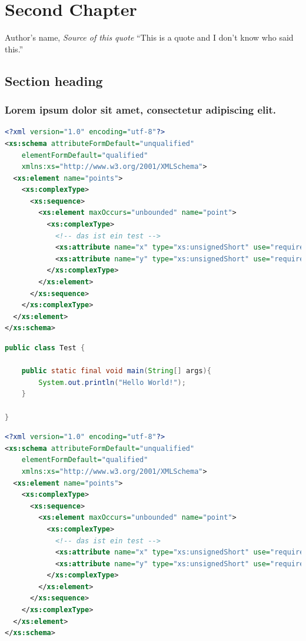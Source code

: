 
\chapter{Second Chapter}

\begin{chapquote}{Author's name, \textit{Source of this quote}}
``This is a quote and I don't know who said this.''
\end{chapquote}

\section{Section heading}
\lipsum[1-2]

\subsection{Lorem ipsum dolor sit amet, consectetur adipiscing elit.}
\lipsum[1-2]

\begin{lstlisting}[language=XML]
<?xml version="1.0" encoding="utf-8"?>
<xs:schema attributeFormDefault="unqualified" 
    elementFormDefault="qualified" 
    xmlns:xs="http://www.w3.org/2001/XMLSchema">
  <xs:element name="points">
    <xs:complexType>
      <xs:sequence>
        <xs:element maxOccurs="unbounded" name="point">
          <xs:complexType>
            <!-- das ist ein test -->  
            <xs:attribute name="x" type="xs:unsignedShort" use="required" />
            <xs:attribute name="y" type="xs:unsignedShort" use="required" />
          </xs:complexType>
        </xs:element>
      </xs:sequence>
    </xs:complexType>
  </xs:element>
</xs:schema>
\end{lstlisting}

 
\begin{lstlisting}[language=Java, caption=Java Code example]
public class Test {

    public static final void main(String[] args){
        System.out.println("Hello World!");
    }
    
}
\end{lstlisting}



\begin{lstlisting}[language=XML, caption=XML Snippet example]
<?xml version="1.0" encoding="utf-8"?>
<xs:schema attributeFormDefault="unqualified" 
    elementFormDefault="qualified" 
    xmlns:xs="http://www.w3.org/2001/XMLSchema">
  <xs:element name="points">
    <xs:complexType>
      <xs:sequence>
        <xs:element maxOccurs="unbounded" name="point">
          <xs:complexType>
            <!-- das ist ein test -->  
            <xs:attribute name="x" type="xs:unsignedShort" use="required" />
            <xs:attribute name="y" type="xs:unsignedShort" use="required" />
          </xs:complexType>
        </xs:element>
      </xs:sequence>
    </xs:complexType>
  </xs:element>
</xs:schema>
\end{lstlisting}

